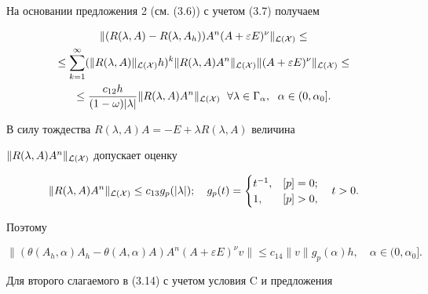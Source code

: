 На основании предложения 2 (см. (3.6)) с учетом (3.7) получаем 


\begin{multline*} 


\|(R(\lambda,A)-R(\lambda,A_h))A^n(A+\varepsilon E)^\nu 


\|_{\cal L(X)} \le \\ 


% 


\le\sum^\infty_{k=1}(\|R(\lambda,A)\|_{\cal L(X)}h)^k 


\|R(\lambda,A)A^n\|_{\cal L(X)} 


\|(A+\varepsilon E)^\nu\|_{\cal L(X)}\le \\ 


% 


\le\frac{c_{12}h}{(1-\omega)|\lambda|} 


\|R(\lambda,A)A^n\|_{\cal L(X)} 


\ \; \forall\lambda\in\Gamma_\alpha, 


\ \; \alpha\in(0,\alpha_0]. 


\end{multline*} 


В силу тождества $R(\lambda,A)A=-E+\lambda R(\lambda,A)$ величина 


$\|R(\lambda,A)A^n\|_{\cal L(X)}$ допускает оценку 


$$ 


\|R(\lambda,A)A^n\|_{\cal L(X)}\le c_{13}g_p(|\lambda|);\quad 


g_p(t)= 


\begin{cases} 


t^{-1}, & [p]=0; \\ 1, & [p]>0, 


\end{cases} 


\quad t>0. 


$$ 


Поэтому 


\begin{equation} 


\|(\theta(A_h,\alpha)A_h-\theta(A,\alpha)A)A^n 


(A+\varepsilon E)^\nu v\|\le c_{14}\|v\|g_p(\alpha)h, 


\quad \alpha\in(0,\alpha_0]. 


\end{equation} 


Для второго слагаемого в (3.14) с учетом условия C и предложения 


